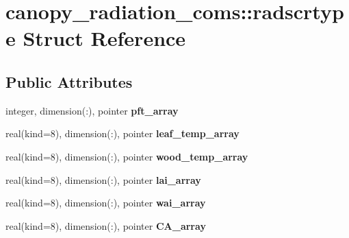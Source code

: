 \hypertarget{structcanopy__radiation__coms_1_1radscrtype}{
\section{canopy\_\-radiation\_\-coms::radscrtype Struct Reference}
\label{structcanopy__radiation__coms_1_1radscrtype}
}
\subsection*{Public Attributes}
\begin{DoxyCompactItemize}
\item 
\hypertarget{structcanopy__radiation__coms_1_1radscrtype_ae27d91a7d8d9c7cf7f98f4b490dcf1e9}{
integer, dimension(:), pointer {\bfseries pft\_\-array}}
\label{structcanopy__radiation__coms_1_1radscrtype_ae27d91a7d8d9c7cf7f98f4b490dcf1e9}

\item 
\hypertarget{structcanopy__radiation__coms_1_1radscrtype_a761b1742b96a3df549d0b0816414aeae}{
real(kind=8), dimension(:), pointer {\bfseries leaf\_\-temp\_\-array}}
\label{structcanopy__radiation__coms_1_1radscrtype_a761b1742b96a3df549d0b0816414aeae}

\item 
\hypertarget{structcanopy__radiation__coms_1_1radscrtype_af76153790c9ee7a18b13d1229cbf0c7f}{
real(kind=8), dimension(:), pointer {\bfseries wood\_\-temp\_\-array}}
\label{structcanopy__radiation__coms_1_1radscrtype_af76153790c9ee7a18b13d1229cbf0c7f}

\item 
\hypertarget{structcanopy__radiation__coms_1_1radscrtype_ad52598f974b4b400c4102931d40d6c88}{
real(kind=8), dimension(:), pointer {\bfseries lai\_\-array}}
\label{structcanopy__radiation__coms_1_1radscrtype_ad52598f974b4b400c4102931d40d6c88}

\item 
\hypertarget{structcanopy__radiation__coms_1_1radscrtype_ab7df4ae2a166b31281fcbde8a3f1fda0}{
real(kind=8), dimension(:), pointer {\bfseries wai\_\-array}}
\label{structcanopy__radiation__coms_1_1radscrtype_ab7df4ae2a166b31281fcbde8a3f1fda0}

\item 
\hypertarget{structcanopy__radiation__coms_1_1radscrtype_af787ff36d86f34ab96f7a532a2e5d665}{
real(kind=8), dimension(:), pointer {\bfseries CA\_\-array}}
\label{structcanopy__radiation__coms_1_1radscrtype_af787ff36d86f34ab96f7a532a2e5d665}


\end{DoxyCompactItemize}
